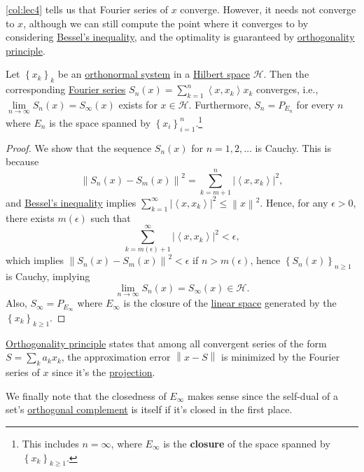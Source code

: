 \autoref{col:lec4} tells us that Fourier series of \(x\) converge. However, it needs not converge to \(x\), although we can still compute the point where it converges to by considering \hyperref[thm:Bessel-ineq]{Bessel's inequality}, and the optimality is guaranteed by \hyperref[thm:orthogonality-principle]{orthogonality principle}.

\begin{theorem}
	Let \(\left\{ x_{k}\right\}_{k} \) be an \hyperref[def:orthonormal-system]{orthonormal system} in a \hyperref[def:Hilbert-space]{Hilbert space} \(\mathcal{H} \). Then the corresponding \hyperref[def:Fourier-series]{Fourier series} \(S_n(x) = \sum_{k=1}^{n} \left\langle  x, x_{k} \right\rangle  x_{k}\) converges, i.e., \(\lim\limits_{n \to \infty} S_{n} (x) = S_{\infty }(x)\) exists for \(x\in \mathcal{H} \). Furthermore, \(S_n = P_{E_n}\) for every \(n\) where \(E_n\) is the space spanned by \(\left\{ x_i \right\} _{i=1}^n\).\footnote{This includes \(n=\infty\), where \(E_\infty \) is the \textbf{closure} of the space spanned by \(\left\{ x_k \right\}_{k\geq 1} \).}
\end{theorem}
\begin{proof}
	We show that the sequence \(S_n(x)\) for \(n = 1, 2, \dots\) is Cauchy. This is because
	\[
		\left\lVert S_n(x) - S_m(x)\right\rVert ^{2} = \sum_{k=m+1}^{n} \left\vert \left\langle x, x_{k}\right\rangle  \right\vert ^{2},
	\]
	and \hyperref[thm:Bessel-ineq]{Bessel's inequality} implies \(\sum_{k=1}^{\infty} \left\vert \left\langle x, x_{k}  \right\rangle  \right\vert ^{2} \leq \left\lVert x\right\rVert ^{2} \). Hence, for any \(\epsilon > 0\), there exists \(m(\epsilon )\) such that
	\[
		\sum_{k=m(\epsilon )+1}^{\infty} \left\vert \left\langle x, x_{k}  \right\rangle  \right\vert ^{2} < \epsilon,
	\]
	which implies \(\left\lVert S_n(x) - S_m(x)\right\rVert ^{2} < \epsilon \) if \(n > m(\epsilon )\), hence \(\left\{ S_{n} (x) \right\}_{n\geq 1}\) is Cauchy, implying
	\[
		\lim_{n \to \infty} S_n(x)= S_\infty (x)\in \mathcal{H} .
	\]
	Also, \(S_\infty = P_{E_\infty }\) where \(E_\infty \) is the closure of the \hyperref[def:linear-vector-space]{linear space} generated by the \(\left\{ x_{k} \right\}_{k \geq 1}\).
\end{proof}

\begin{remark}
	\hyperref[thm:orthogonality-principle]{Orthogonality principle} states that among all convergent series of the form \(S = \sum_{k} a_k x_k \), the approximation error \(\left\lVert x - S\right\rVert \) is minimized by the Fourier series of \(x\) since it's the \hyperref[def:orthogonal-projection]{projection}.
\end{remark}

We finally note that the closedness of \(E_\infty \) makes sense since the self-dual of a set's \hyperref[def:orthogonal-complement]{orthogonal complement} is itself if it's closed in the first place.